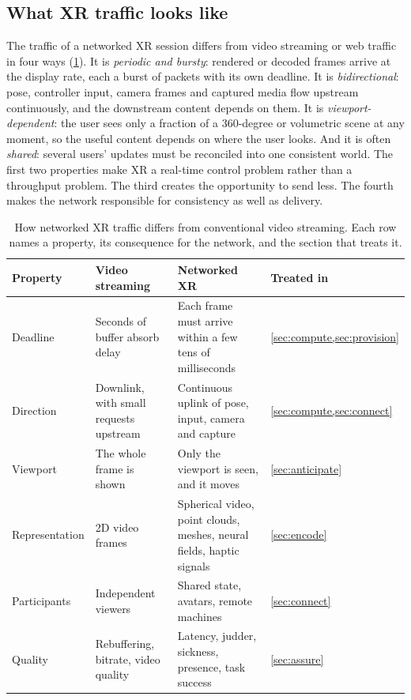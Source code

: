 \subsection{What XR traffic looks like}
The traffic of a networked XR session differs from video streaming or web traffic in four ways
(\cref{tab:background}). It is \emph{periodic and bursty}: rendered or decoded frames arrive at the
display rate, each a burst of packets with its own deadline. It is \emph{bidirectional}: pose, controller
input, camera frames and captured media flow upstream continuously, and the downstream content depends on
them. It is \emph{viewport-dependent}: the user sees only a fraction of a 360-degree or volumetric scene
at any moment, so the useful content depends on where the user looks. And it is often \emph{shared}:
several users' updates must be reconciled into one consistent world. The first two properties make XR a
real-time control problem rather than a throughput problem. The third creates the opportunity to send
less. The fourth makes the network responsible for consistency as well as delivery.

\begin{table}[t]
\centering\small
\caption{How networked XR traffic differs from conventional video streaming. Each row names a
property, its consequence for the network, and the section that treats it.}\label{tab:background}
\setlength{\tabcolsep}{4pt}
\begin{tabularx}{\linewidth}{@{}>{\raggedright\arraybackslash}p{2.3cm}>{\raggedright\arraybackslash}X>{\raggedright\arraybackslash}X>{\raggedright\arraybackslash}p{1.9cm}@{}}
\toprule
Property & Video streaming & Networked XR & Treated in\\
\midrule
Deadline & Seconds of buffer absorb delay & Each frame must arrive within a few tens of milliseconds & \cref{sec:compute,sec:provision}\\
Direction & Downlink, with small requests upstream & Continuous uplink of pose, input, camera and capture & \cref{sec:compute,sec:connect}\\
Viewport & The whole frame is shown & Only the viewport is seen, and it moves & \cref{sec:anticipate}\\
Representation & 2D video frames & Spherical video, point clouds, meshes, neural fields, haptic signals & \cref{sec:encode}\\
Participants & Independent viewers & Shared state, avatars, remote machines & \cref{sec:connect}\\
Quality & Rebuffering, bitrate, video quality & Latency, judder, sickness, presence, task success & \cref{sec:assure}\\
\bottomrule
\end{tabularx}
\end{table}

